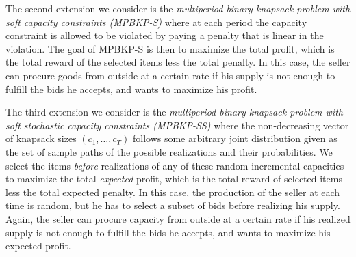 The second extension we consider is the \emph{multiperiod binary knapsack problem with soft capacity constraints (MPBKP-S)} where {  at each period the capacity constraint is allowed to be violated by paying a penalty that is linear in the violation.} The goal of MPBKP-S is then to maximize the total profit, which is the total reward of the selected items less the total penalty. In this case, the seller can procure goods from outside at a certain rate if his supply is not enough to fulfill the bids he accepts, and wants to maximize his profit.

{ 
The third extension we consider is the \emph{multiperiod binary knapsack problem with soft stochastic capacity constraints (MPBKP-SS)} where the non-decreasing vector of knapsack sizes $(c_1, \ldots, c_T)$ follows some arbitrary joint distribution given as the set of sample paths of the possible realizations and their probabilities. We select the items \emph{before} realizations of any of these random incremental capacities to maximize the total \emph{expected} profit, which is the total reward of selected items less the total expected penalty. In this case, the production of the seller at each time is random, but he has to select a subset of bids before realizing his supply. Again, the seller can procure capacity from outside at a certain rate if his realized supply is not enough to fulfill the bids he accepts, and wants to maximize his expected profit.
}

